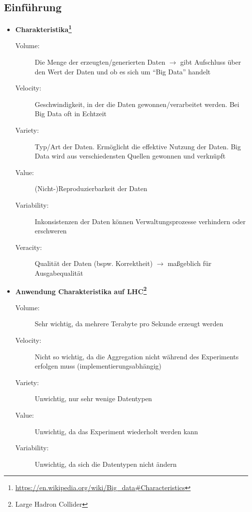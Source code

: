 \subsection{Einführung}
\begin{itemize}
	\item \textbf{Charakteristika\footnote{\url{https://en.wikipedia.org/wiki/Big_data\#Characteristics}}}
	\begin{description}
		\item[Volume:] Die Menge der erzeugten/generierten Daten \(\rightarrow\) gibt Aufschluss über den Wert der Daten und ob es sich um "`Big Data"' handelt
		\item[Velocity:] Geschwindigkeit, in der die Daten gewonnen/verarbeitet werden. Bei Big Data oft in Echtzeit
		\item[Variety:] Typ/Art der Daten. Ermöglicht die effektive Nutzung der Daten. Big Data wird aus verschiedensten Quellen gewonnen und verknüpft
		\item[Value:] (Nicht-)Reproduzierbarkeit der Daten
		\item[Variability:] Inkonsistenzen der Daten können Verwaltungsprozesse verhindern oder erschweren
		\item[Veracity:] Qualität der Daten (bspw. Korrektheit) \(\rightarrow\) maßgeblich für Ausgabequalität
	\end{description}
	\item \textbf{Anwendung Charakteristika auf LHC\footnote{Large Hadron Collider}}
	\begin{description}
		\item[Volume:] Sehr wichtig, da mehrere Terabyte pro Sekunde erzeugt werden
		\item[Velocity:] Nicht so wichtig, da die Aggregation nicht während des Experiments erfolgen muss (implementierungsabhängig)
		\item[Variety:] Unwichtig, nur sehr wenige Datentypen
		\item[Value:] Unwichtig, da das Experiment wiederholt werden kann
		\item[Variability:] Unwichtig, da sich die Datentypen nicht ändern 
	\end{description}
\end{itemize}



